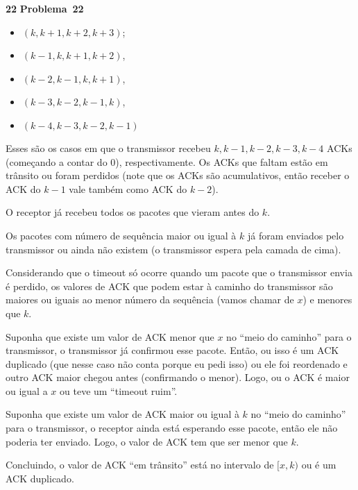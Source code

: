 \documentclass{article}
\newcounter{exe-list}
\newenvironment{exe-list}
    {\begin{list}{\alph{exe-list}.}{\usecounter{exe-list}}}
    {\end{list}}
\newenvironment{exe}[2][Problema]
    {\newcommand{\opt}{(Opcional)}%
    \newcommand{\sketch}[1]{{\bfseries Rascunho:} ##1}%
    \medskip\par\noindent\ifthenelse{\equal{#1}{}}
        {\textbf{\large #2}}
        {\textbf{\large #1~#2}}%
    \medskip\par\noindent}
    {\medskip}
\begin{document}
\begin{exe}{22}
    \begin{exe-list}
    \item
        \begin{itemize}
            \item \((k, k+1, k+2, k+3)\);
            \item \((k-1, k, k+1, k+2)\),
            \item \((k-2, k-1, k, k+1)\),
            \item \((k-3, k-2, k-1, k)\),
            \item \((k-4, k-3, k-2, k-1)\)
        \end{itemize}
        Esses são os casos em que o transmissor recebeu
        \(k, k-1, k-2, k-3, k-4\) ACKs
        (começando a contar do \(0\)), respectivamente.
        Os ACKs que faltam estão em trânsito ou foram perdidos
        (note que os ACKs são acumulativos,
        então receber o ACK do \(k-1\) vale também como
        ACK do \(k-2\)).

        O receptor já recebeu todos os pacotes que vieram
        antes do \(k\).

        Os pacotes com número de sequência maior ou igual à \(k\)
        já foram enviados pelo transmissor
        ou ainda não existem
        (o transmissor espera pela camada de cima).
    \item
        Considerando que o timeout só ocorre quando
        um pacote que o transmissor envia é perdido,
        os valores de ACK que podem estar à caminho
        do transmissor são
        maiores ou iguais ao menor número da sequência
        (vamos chamar de \(x\))
        e menores que \(k\).

        Suponha que existe um valor de ACK menor que \(x\)
        no ``meio do caminho'' para o transmissor,
        o transmissor já confirmou esse pacote.
        Então, ou isso é um ACK duplicado
        (que nesse caso não conta porque eu pedi isso)
        ou ele foi reordenado e outro ACK maior
        chegou antes (confirmando o menor).
        Logo, ou o ACK é maior ou igual a \(x\)
        ou teve um ``timeout ruim''.

        Suponha que existe um valor de ACK maior ou igual à \(k\)
        no ``meio do caminho'' para o transmissor,
        o receptor ainda está esperando esse pacote,
        então ele não poderia ter enviado.
        Logo, o valor de ACK tem que ser menor que \(k\).

        Concluindo, o valor de ACK ``em trânsito''
        está no intervalo de \([x, k)\) ou
        é um ACK duplicado.
    \end{exe-list}
\end{exe}
\end{document}

